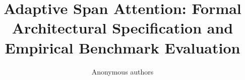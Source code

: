 \title{\textbf{Adaptive Span Attention: Formal Architectural Specification and Empirical Benchmark Evaluation}}

\author{Anonymous authors}
